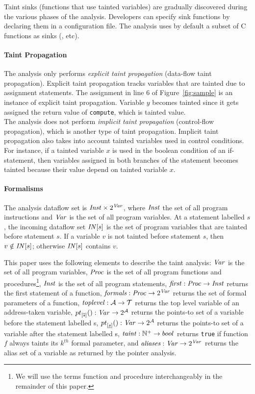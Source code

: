 Taint sinks (functions that use tainted variables) are gradually
discovered during the various phases of the analysis. Developers
can specify sink functions by declaring them in a configuration
file. The analysis uses by default a subset of C functions as
sinks ({\tt  }, etc).

\paragraph{Taint Propagation}
The analysis only performs \textit{explicit taint propagation}
(data-flow taint propagation). Explicit taint propagation tracks variables
that are tainted due to assignment statements. The assignment in line $6$
of Figure~\ref{fig:sample} is an instance of explicit taint propagation.
Variable $y$ becomes tainted since it gets assigned the return value of
\texttt{compute}, which is tainted value.\\
The analysis does not perform \textit{implicit taint propagation}
(control-flow propagation), which is another type of taint propagation.
Implicit taint propagation also takes into account tainted variables
used in control conditions. For instance, if a tainted variable $x$ is
used in the boolean condition of an if-statement, then variables
assigned in both branches of the statement becomes tainted because
their value depend on tainted variable $x$.

\paragraph{Formalisms}
The analysis dataflow set is $\mathit{Inst} \times 2^\mathit{Var}$,
where $\mathit{Inst}$ the set of all program instructions
and $\mathit{Var}$ is the set of all program variables. 
At a statement labelled $s$, the incoming dataflow set $\mathit{IN}[s]$
is the set of program variables that are tainted before statement $s$.
If a variable $v$ is not tainted before statement $s$, then
$v \notin \mathit{IN}[s]$; otherwise $\mathit{IN}[s]$ contains $v$.

This paper uses the following elements to describe the
taint analysis:
$\mathit{Var}$ is the set of all program variables,
$\mathit{Proc}$ is the set of all program functions and procedures\footnote{We
will use the terms function and procedure interchangeably in
the remainder of this paper.},
$\mathit{Inst}$ is the set of all program statements,
$\mathit{first}{}: \mathit{Proc} \rightarrow \mathit{Inst}$ returns the first
statement of a function,
$\mathit{formals}{}: \mathit{Proc} \rightarrow 2^{\mathit{Var}}$ returns the
set of formal parameters of a function, 
$\mathit{toplevel}{}: \mathcal{A} \rightarrow \mathcal{T}$ returns the top level
variable of an address-taken variable,
${pt}_{[\overline{s}] }(): \mathit{Var} \rightarrow 2^\mathcal{A}$ returns the
points-to set of a variable before the statement labelled s, 
${pt}_{[\underline{s}]}(): \mathit{Var} \rightarrow 2^\mathcal{A}$ returns the
points-to set of a variable after the statement labelled s,
$\mathit{taint}: \mathbb{N}^+ \rightarrow bool$ returns \texttt{true}
if function $f$ always taints its $k^{th}$ formal parameter, and
$\mathit{aliases}: \mathit{Var} \rightarrow 2^\mathit{Var}$ returns the alias set of
a variable as returned by the pointer analysis.

